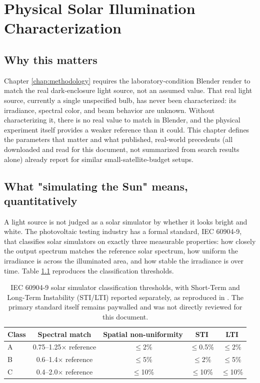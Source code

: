 \chapter{Physical Solar Illumination Characterization}
\label{chap:physical-solar}

\section{Why this matters}

Chapter \ref{chap:methodology} requires the laboratory-condition Blender render to match the real dark-enclosure light source, not an assumed value. That real light source, currently a single unspecified bulb, has never been characterized: its irradiance, spectral color, and beam behavior are unknown. Without characterizing it, there is no real value to match in Blender, and the physical experiment itself provides a weaker reference than it could. This chapter defines the parameters that matter and what published, real-world precedents (all downloaded and read for this document, not summarized from search results alone) already report for similar small-satellite-budget setups.

\section{What "simulating the Sun" means, quantitatively}

A light source is not judged as a solar simulator by whether it looks bright and white. The photovoltaic testing industry has a formal standard, IEC 60904-9, that classifies solar simulators on exactly three measurable properties: how closely the output spectrum matches the reference solar spectrum, how uniform the irradiance is across the illuminated area, and how stable the irradiance is over time. Table \ref{tab:iec-classes} reproduces the classification thresholds.

\begin{table}[!ht]
\centering
\small
\caption{IEC 60904-9 solar simulator classification thresholds, with Short-Term and Long-Term Instability (STI/LTI) reported separately, as reproduced in \cite{schulthess2026classaaa}. The primary standard itself remains paywalled and was not directly reviewed for this document.}
\label{tab:iec-classes}
\begin{tabular}{lcccc}
\toprule
\textbf{Class} & \textbf{Spectral match} & \textbf{Spatial non-uniformity} & \textbf{STI} & \textbf{LTI} \\
\midrule
A   & 0.75--1.25$\times$ reference & $\leq$2\%  & $\leq$0.5\% & $\leq$2\% \\
B   & 0.6--1.4$\times$ reference   & $\leq$5\%  & $\leq$2\%   & $\leq$5\% \\
C   & 0.4--2.0$\times$ reference   & $\leq$10\% & $\leq$10\%  & $\leq$10\% \\
\bottomrule
\end{tabular}
\end{table}

